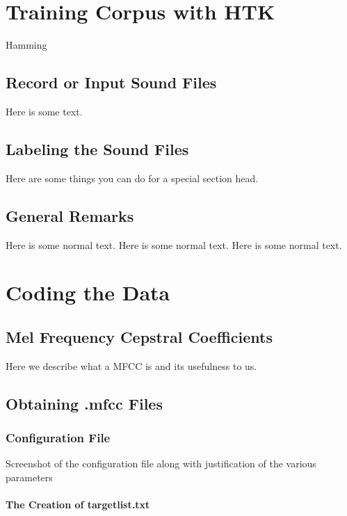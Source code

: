 \documentclass{wileySev}
\begin{document}
\chapter{Training Corpus with HTK}

{Hamming \cite{hamming}}


\section{Record or Input Sound Files}
Here is some text.


\section{Labeling the Sound Files}
Here are some things you can do for a special
section head.

\section{General Remarks}
Here is some normal text.
Here is some normal text.
Here is some normal text.



\chapter{Coding the Data}

\section{Mel Frequency Cepstral Coefficients}
Here we describe what a MFCC is and its usefulness to us.

\section{Obtaining .mfcc Files}

\subsection{Configuration File}
Screenshot of the configuration file along with justification of the various parameters

\subsubsection{The Creation of targetlist.txt}
\end{document}
